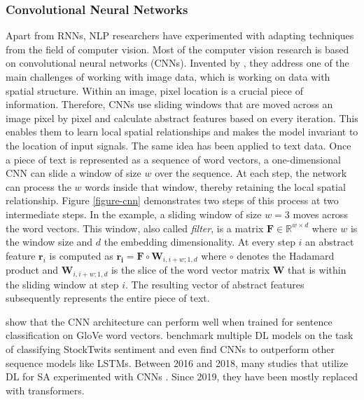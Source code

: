 \subsubsection{Convolutional Neural Networks}
Apart from RNNs, NLP researchers have experimented with adapting techniques from the field of computer vision. Most of the computer vision research is based on convolutional neural networks (CNNs). Invented by , they address one of the main challenges of working with image data, which is working on data with spatial structure. Within an image, pixel location is a crucial piece of information. Therefore, CNNs use sliding windows that are moved across an image pixel by pixel and calculate abstract features based on every iteration. This enables them to learn local spatial relationships and makes the model invariant to the location of input signals. The same idea has been applied to text data. Once a piece of text is represented as a sequence of word vectors, a one-dimensional CNN can slide a window of size $w$ over the sequence. At each step, the network can process the $w$ words inside that window, thereby retaining the local spatial relationship. Figure \ref{figure-cnn} demonstrates two steps of this process at two intermediate steps. In the example, a sliding window of size $w = 3$ moves across the word vectors. This window, also called \emph{filter}, is a matrix $\bm{F}\in \mathbb{R}^{w \times d}$ where $w$ is the window size and $d$ the embedding dimensionality. At every step $i$ an abstract feature $\bm{r}_i$ is computed as $\bm{r_i} = \bm{F} \circ \bm{W}_{i,i+w;1,d}$ where $\circ$ denotes the Hadamard product and $\bm{W}_{i,i+w;1,d}$ is the slice of the word vector matrix $\bm{W}$ that is  within the sliding window at step $i$. The resulting vector of abstract features subsequently represents the entire piece of text.



 show that the CNN architecture can perform well when trained for sentence classification on GloVe word vectors.  benchmark multiple DL models on the task of classifying StockTwits sentiment and even find CNNs to outperform other sequence models like LSTMs. Between 2016 and 2018, many studies that utilize DL for SA experimented with CNNs . Since 2019, they have been mostly replaced with transformers.

